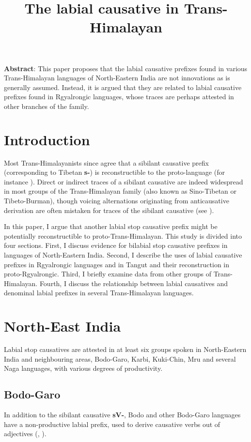 \documentclass[oneside,a4paper,11pt]{article}
\newcommand{\ipa}[1]{\textbf{{\phon\mbox{#1}}}} %
\begin{document}
\title{The labial causative in Trans-Himalayan}
\maketitle
\sloppy
\textbf{Abstract}: This paper proposes that the labial causative prefixes found in various Trans-Himalayan languages of North-Eastern India are not innovations as is generally assumed. Instead, it is argued that they are related to labial causative prefixes found in Rgyalrongic languages, whose traces are perhaps attested in other branches of the family.

\section{Introduction}
Most Trans-Himalayanists since \citet{conrady1896} agree that a sibilant causative prefix (corresponding to Tibetan \ipa{s-}) is reconstructible to the proto-language (for instance \citealt{wolfenden29outlines, matisoff03}). Direct or indirect traces of a sibilant causative are indeed widespread in most groups of the Trans-Himalayan family (also known as Sino-Tibetan or Tibeto-Burman), though voicing alternations originating from anticausative derivation are often mistaken for traces of the sibilant causative (see \citealt{jacques15causative}).

In this paper, I argue that another labial stop causative prefix might be potentially reconstructible to proto-Trans-Himalayan. This study is divided into four sections. First,  I discuss evidence for bilabial stop causative prefixes in languages of North-Eastern India. Second, I describe the uses of labial causative prefixes in Rgyalrongic languages and in Tangut and their reconstruction in proto-Rgyalrongic. Third, I briefly examine data from other groups of Trans-Himalayan. Fourth, I discuss the relationship between labial causatives and denominal labial prefixes in several Trans-Himalayan languages.

\section{North-East India}
Labial stop causatives are attested in at least six groups spoken in North-Eastern India and neighbouring areas, Bodo-Garo, Karbi, Kuki-Chin, Mru and several Naga languages, with various degrees of productivity.

\subsection{Bodo-Garo}
In addition to the sibilant causative \ipa{sV-}, Bodo and other Bodo-Garo languages have a non-productive labial prefix, used to derive causative verbs out of adjectives (\citealt[90]{mazo04st}, \citealt{delancey15adjectival}).
\end{document}
